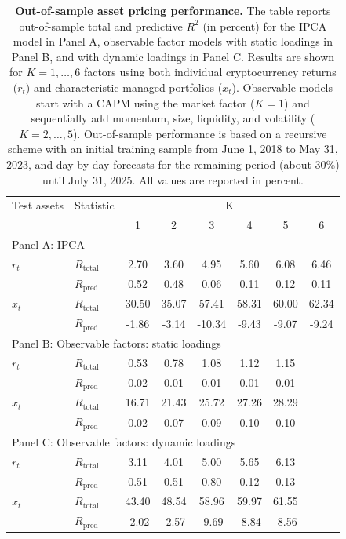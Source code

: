 \documentclass[
  12pt,
  a4paper,
  openany]{scrbook}
\begin{document}
\begin{table}[h]
\centering
\small
\caption[Out-of-sample asset pricing performance]%
{%
\textbf{Out-of-sample asset pricing performance.}
The table reports out-of-sample total and predictive $R^2$ (in percent) for the IPCA model in Panel A, observable factor models with static loadings in Panel B, and with dynamic loadings in Panel C. Results are shown for $K=1,\dots,6$ factors using both individual cryptocurrency returns ($r_t$) and characteristic-managed portfolios ($x_t$). Observable models start with a CAPM using the market factor ($K=1$) and sequentially add momentum, size, liquidity, and volatility ($K=2,\dots,5$). Out-of-sample performance is based on a recursive scheme with an initial training sample from June 1, 2018 to May 31, 2023, and day-by-day forecasts for the remaining period (about 30\%) until July 31, 2025. All values are reported in percent.
}
\label{tbl-oos-comparison}
\vspace{5pt} %
\begin{tabular}{llcccccc}
\toprule
Test assets & Statistic & \multicolumn{6}{c}{K} \\
\cmidrule(lr){3-8}
 &  & 1 & 2 & 3 & 4 & 5 & 6 \\
\midrule
\multicolumn{8}{l}{Panel A: IPCA} \\
\midrule
$r_t$ & $R_{\text{total}}$ & 2.70  & 3.60  & 4.95   & 5.60  & 6.08  & 6.46 \\
      & $R_{\text{pred}}$  & 0.52  & 0.48  & 0.06   & 0.11  & 0.12  & 0.11 \\
$x_t$ & $R_{\text{total}}$ & 30.50 & 35.07 & 57.41  & 58.31 & 60.00 & 62.34 \\
      & $R_{\text{pred}}$  & -1.86 & -3.14 & -10.34 & -9.43 & -9.07 & -9.24 \\
\midrule
\multicolumn{8}{l}{Panel B: Observable factors: static loadings} \\
\midrule
$r_t$ & $R_{\text{total}}$ & 0.53  & 0.78  & 1.08  & 1.12  & 1.15 & \\
      & $R_{\text{pred}}$  & 0.02  & 0.01  & 0.01  & 0.01  & 0.01 & \\
$x_t$ & $R_{\text{total}}$ & 16.71 & 21.43 & 25.72 & 27.26 & 28.29 & \\
      & $R_{\text{pred}}$  & 0.02  & 0.07  & 0.09  & 0.10  & 0.10 & \\
\midrule
\multicolumn{8}{l}{Panel C: Observable factors: dynamic loadings} \\
\midrule
$r_t$ & $R_{\text{total}}$ & 3.11  & 4.01  & 5.00  & 5.65  & 6.13 & \\
      & $R_{\text{pred}}$  & 0.51  & 0.51  & 0.80  & 0.12  & 0.13 & \\
$x_t$ & $R_{\text{total}}$ & 43.40 & 48.54 & 58.96 & 59.97 & 61.55 & \\
      & $R_{\text{pred}}$  & -2.02 & -2.57 & -9.69 & -8.84 & -8.56 & \\
\bottomrule
\end{tabular}
\end{table}
\end{document}
